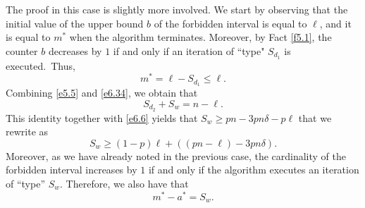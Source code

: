 \documentclass[10pt]{amsart}
\theoremstyle{remark}
\newcommand{\meg}{\geqslant}
\newcommand{\mik}{\leqslant}
\begin{document}
The proof in this case is slightly more involved.
We start by observing that the initial value of the upper bound $b$ of the forbidden interval is equal to $\ell$,
and it is equal to $m^*$ when the algorithm terminates. Moreover, by Fact \ref{f5.1}, the counter $b$ decreases
by $1$ if and only if an iteration of ``type" $S_{d_1}$ is executed.~Thus,
\begin{equation} \label{e6.34}
m^*=\ell-S_{d_1}\mik \ell.
\end{equation}
Combining \eqref{e5.5} and \eqref{e6.34}, we obtain that
\begin{equation} \label{e6.35}
S_{d_2}+S_w=n-\ell.
\end{equation}
This identity together with \eqref{e6.6} yields that $S_w\meg pn-3pn\delta-p\ell$ that we rewrite as
\begin{equation} \label{e6.36}
S_w\meg (1-p)\ell+\left(\left(pn-\ell\right)-3pn\delta\right).
\end{equation}
Moreover, as we have already noted in the previous case, the cardinality of the forbidden interval increases by $1$
if and only if the algorithm executes an iteration of ``type'' $S_w$. Therefore, we also have that
\begin{equation} \label{e6.37}
m^*-a^*=S_w.
\end{equation}
\end{document}
